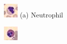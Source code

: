 \begin{figure}
    \centering
    \begin{minipage}{0.22\textwidth}
        \includegraphics[width=\linewidth]{images/bloodmnist_classes/neutrophil.png}
        (a) Neutrophil
    \end{minipage}
    \hfill
    \begin{minipage}{0.22\textwidth}
        \includegraphics[width=\linewidth]{images/bloodmnist_classes/eosinophil.png}

\end{minipage}
\end{figure}

